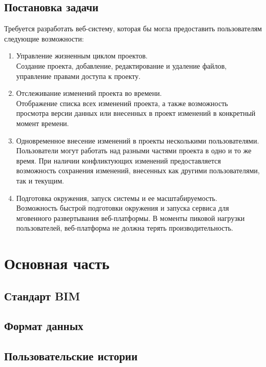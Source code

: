 \documentclass[a4paper,14pt]{extreport} %
\begin{document}
\section{Постановка задачи}

Требуется разработать веб-систему, которая бы могла предоставить пользователям следующие возможности:
\begin{enumerate}
\item Управление жизненным циклом проектов. \\
Создание проекта, добавление, редактирование  и удаление файлов, управление правами доступа к проекту.
\item Отслеживание изменений проекта во времени. \\
Отображение списка всех изменений проекта, а также возможность просмотра версии данных или внесенных в проект изменений в конкретный момент времени.
\item Одновременное внесение изменений в проекты несколькими пользователями. \\
Пользователи могут работать над разными частями проекта в одно и то же время. При наличии конфликтующих изменений предоставляется возможность сохранения изменений, внесенных как другими пользователями, так и текущим.
\item Подготовка окружения, запуск системы и ее масштабируемость. \\
Возможность быстрой подготовки окружения и запуска сервиса для мговенного развертывания веб-платформы. В моменты пиковой нагрузки пользователей, веб-платформа не должна терять производительность.
\end{enumerate}

\newpage

\chapter{Основная часть}
\section{Стандарт BIM}


\newpage
\section{Формат данных}


\newpage
\section{Пользовательские истории}
\end{document}

